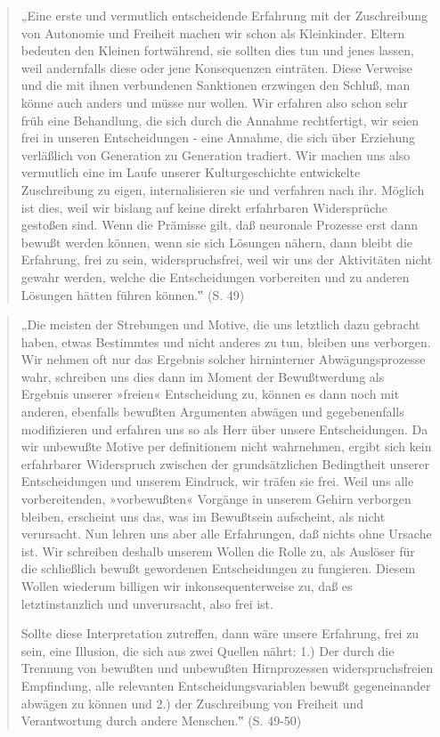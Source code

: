 \documentclass[
  a4paper,
]{report}
\begin{document}
\begin{quote}
„Eine erste und vermutlich entscheidende Erfahrung mit der Zuschreibung von Autonomie und Freiheit machen wir schon als Kleinkinder. Eltern bedeuten den Kleinen fortwährend, sie sollten dies tun und jenes lassen, weil andernfalls diese oder jene Konsequenzen einträten. Diese Verweise und die mit ihnen verbundenen Sanktionen erzwingen den Schluß, man könne auch anders und müsse nur wollen. Wir erfahren also schon sehr früh eine Behandlung, die sich durch die Annahme rechtfertigt, wir seien frei in unseren Entscheidungen - eine Annahme, die sich über Erziehung verläßlich von Generation zu Generation tradiert. Wir machen uns also vermutlich eine im Laufe unserer Kulturgeschichte entwickelte Zuschreibung zu eigen, internalisieren sie und verfahren nach ihr. Möglich ist dies, weil wir bislang auf keine direkt erfahrbaren Widersprüche gestoßen sind. Wenn die Prämisse gilt, daß neuronale Prozesse erst dann bewußt werden können, wenn sie sich Lösungen nähern, dann bleibt die Erfahrung, frei zu sein, widerspruchsfrei, weil wir uns der Aktivitäten nicht gewahr werden, welche die Entscheidungen vorbereiten und zu anderen Lösungen hätten führen können.‟ (S. 49)
\end{quote}

\begin{quote}
„Die meisten der Strebungen und Motive, die uns letztlich dazu gebracht haben, etwas Bestimmtes und nicht anderes zu tun, bleiben uns verborgen. Wir nehmen oft nur das Ergebnis solcher hirninterner Abwägungsprozesse wahr, schreiben uns dies dann im Moment der Bewußtwerdung als Ergebnis unserer »freien« Entscheidung zu, können es dann noch mit anderen, ebenfalls bewußten Argumenten abwägen und gegebenenfalls modifizieren und erfahren uns so als Herr über unsere Entscheidungen. Da wir unbewußte Motive per definitionem nicht wahrnehmen, ergibt sich kein erfahrbarer Widerspruch zwischen der grundsätzlichen Bedingtheit unserer Entscheidungen und unserem Eindruck, wir träfen sie frei. Weil uns alle vorbereitenden, »vorbewußten« Vorgänge in unserem Gehirn verborgen bleiben, erscheint uns das, was im Bewußtsein aufscheint, als nicht verursacht. Nun lehren uns aber alle Erfahrungen, daß nichts ohne Ursache ist. Wir schreiben deshalb unserem Wollen die Rolle zu, als Auslöser für die schließlich bewußt gewordenen Entscheidungen zu fungieren. Diesem Wollen wiederum billigen wir inkonsequenterweise zu, daß es letztinstanzlich und unverursacht, also frei ist.

Sollte diese Interpretation zutreffen, dann wäre unsere Erfahrung, frei zu sein, eine Illusion, die sich aus zwei Quellen nährt: 1.) Der durch die Trennung von bewußten und unbewußten Hirnprozessen widerspruchsfreien Empfindung, alle relevanten Entscheidungsvariablen bewußt gegeneinander abwägen zu können und 2.) der Zuschreibung von Freiheit und Verantwortung durch andere Menschen.‟ (S. 49-50)
\end{quote}
\end{document}
